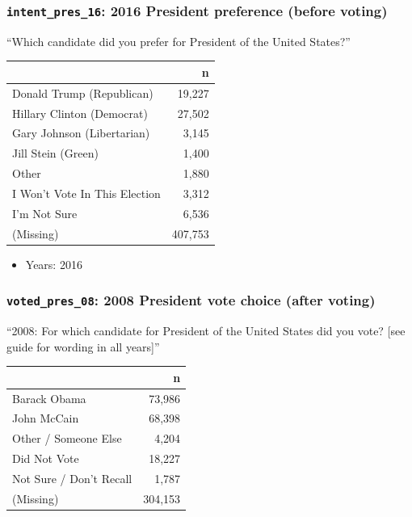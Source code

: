 \documentclass[10pt,article,oneside]{memoir}
\theoremstyle{definition}
\begin{document}
\hypertarget{intent_pres_16-2016-president-preference-before-voting}{%
\subsubsection{\texorpdfstring{\texttt{intent\_pres\_16}: 2016 President
preference (before
voting)}{intent\_pres\_16: 2016 President preference (before voting)}}\label{intent_pres_16-2016-president-preference-before-voting}}

``Which candidate did you prefer for President of the United States?''

\begin{table}[H]
\centering
\begin{tabular}{lr}
\toprule
 & n\\
\midrule
Donald Trump (Republican) & 19,227\\
Hillary Clinton (Democrat) & 27,502\\
Gary Johnson (Libertarian) & 3,145\\
Jill Stein (Green) & 1,400\\
Other & 1,880\\
I Won't Vote In This Election & 3,312\\
I'm Not Sure & 6,536\\
(Missing) & 407,753\\
\bottomrule
\end{tabular}
\end{table}

\begin{itemize}
\tightlist
\item
  Years: 2016
\end{itemize}

\hypertarget{voted_pres_08-2008-president-vote-choice-after-voting}{%
\subsubsection{\texorpdfstring{\texttt{voted\_pres\_08}: 2008 President
vote choice (after
voting)}{voted\_pres\_08: 2008 President vote choice (after voting)}}\label{voted_pres_08-2008-president-vote-choice-after-voting}}

``2008: For which candidate for President of the United States did you
vote? {[}see guide for wording in all years{]}''

\begin{table}[H]
\centering
\begin{tabular}{lr}
\toprule
 & n\\
\midrule
Barack Obama & 73,986\\
John McCain & 68,398\\
Other / Someone Else & 4,204\\
Did Not Vote & 18,227\\
Not Sure / Don't Recall & 1,787\\
(Missing) & 304,153\\
\bottomrule
\end{tabular}
\end{table}
\end{document}
